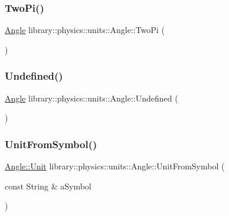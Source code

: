 \subsubsection{\texorpdfstring{Two\+Pi()}{TwoPi()}}
{\footnotesize\ttfamily \hyperlink{classlibrary_1_1physics_1_1units_1_1_angle}{Angle} library\+::physics\+::units\+::\+Angle\+::\+Two\+Pi (\begin{DoxyParamCaption}{ }\end{DoxyParamCaption})\hspace{0.3cm}{\ttfamily [static]}}

\mbox{\label{classlibrary_1_1physics_1_1units_1_1_angle_a9c9a16c58d7e1e95e38cf2adf888f334}} 
\subsubsection{\texorpdfstring{Undefined()}{Undefined()}}
{\footnotesize\ttfamily \hyperlink{classlibrary_1_1physics_1_1units_1_1_angle}{Angle} library\+::physics\+::units\+::\+Angle\+::\+Undefined (\begin{DoxyParamCaption}{ }\end{DoxyParamCaption})\hspace{0.3cm}{\ttfamily [static]}}

\mbox{\label{classlibrary_1_1physics_1_1units_1_1_angle_a78686250c9216e06b93f595d40ddfef1}} 
\subsubsection{\texorpdfstring{Unit\+From\+Symbol()}{UnitFromSymbol()}}
{\footnotesize\ttfamily \hyperlink{classlibrary_1_1physics_1_1units_1_1_angle_a3c329d415a61783b16ce481874cc5956}{Angle\+::\+Unit} library\+::physics\+::units\+::\+Angle\+::\+Unit\+From\+Symbol (\begin{DoxyParamCaption}\item[{const String \&}]{a\+Symbol }\end{DoxyParamCaption})\hspace{0.3cm}{\ttfamily [static]}}

